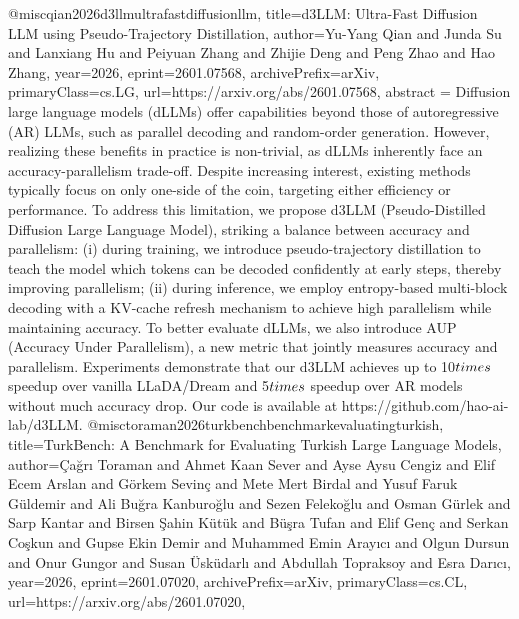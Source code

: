 {}@misc{qian2026d3llmultrafastdiffusionllm,
      title={d3LLM: Ultra-Fast Diffusion LLM using Pseudo-Trajectory Distillation}, 
      author={Yu-Yang Qian and Junda Su and Lanxiang Hu and Peiyuan Zhang and Zhijie Deng and Peng Zhao and Hao Zhang},
      year={2026},
      eprint={2601.07568},
      archivePrefix={arXiv},
      primaryClass={cs.LG},
      url={https://arxiv.org/abs/2601.07568},
      abstract = {Diffusion large language models (dLLMs) offer capabilities beyond those of autoregressive (AR) LLMs, such as parallel decoding and random-order generation. However, realizing these benefits in practice is non-trivial, as dLLMs inherently face an accuracy-parallelism trade-off. Despite increasing interest, existing methods typically focus on only one-side of the coin, targeting either efficiency or performance. To address this limitation, we propose d3LLM (Pseudo-Distilled Diffusion Large Language Model), striking a balance between accuracy and parallelism: (i) during training, we introduce pseudo-trajectory distillation to teach the model which tokens can be decoded confidently at early steps, thereby improving parallelism; (ii) during inference, we employ entropy-based multi-block decoding with a KV-cache refresh mechanism to achieve high parallelism while maintaining accuracy. To better evaluate dLLMs, we also introduce AUP (Accuracy Under Parallelism), a new metric that jointly measures accuracy and parallelism. Experiments demonstrate that our d3LLM achieves up to 10$\\times$ speedup over vanilla LLaDA/Dream and 5$\\times$ speedup over AR models without much accuracy drop. Our code is available at https://github.com/hao-ai-lab/d3LLM.}
}@misc{toraman2026turkbenchbenchmarkevaluatingturkish,
      title={TurkBench: A Benchmark for Evaluating Turkish Large Language Models}, 
      author={Çağrı Toraman and Ahmet Kaan Sever and Ayse Aysu Cengiz and Elif Ecem Arslan and Görkem Sevinç and Mete Mert Birdal and Yusuf Faruk Güldemir and Ali Buğra Kanburoğlu and Sezen Felekoğlu and Osman Gürlek and Sarp Kantar and Birsen Şahin Kütük and Büşra Tufan and Elif Genç and Serkan Coşkun and Gupse Ekin Demir and Muhammed Emin Arayıcı and Olgun Dursun and Onur Gungor and Susan Üsküdarlı and Abdullah Topraksoy and Esra Darıcı},
      year={2026},
      eprint={2601.07020},
      archivePrefix={arXiv},
      primaryClass={cs.CL},
      url={https://arxiv.org/abs/2601.07020},
}
